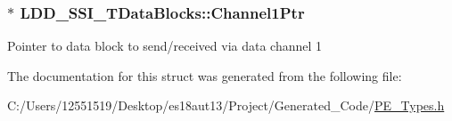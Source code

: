 \subsubsection[{Channel1\+Ptr}]{$\ast$ L\+D\+D\+\_\+\+S\+S\+I\+\_\+\+T\+Data\+Blocks\+::\+Channel1\+Ptr}\label{struct_l_d_d___s_s_i___t_data_blocks_a5c0e65fe82f88a245123217769316fef}
Pointer to data block to send/received via data channel 1 

The documentation for this struct was generated from the following file\+:\begin{DoxyCompactItemize}
\item 
C\+:/\+Users/12551519/\+Desktop/es18aut13/\+Project/\+Generated\+\_\+\+Code/\hyperlink{_p_e___types_8h}{P\+E\+\_\+\+Types.\+h}\end{DoxyCompactItemize}
